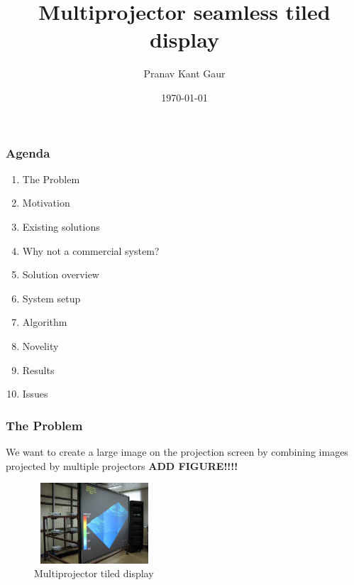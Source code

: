\documentclass{beamer}
\title{Multiprojector seamless tiled display}
\author{Pranav Kant Gaur}
\institute{Graphics and Visualization section}
\date{\today}
\begin{document}
\begin{frame}
\titlepage
\end{frame}

\begin{frame}
\frametitle{Agenda}
\begin{enumerate}
\item The Problem 
\item Motivation
\item Existing solutions
\item Why not a commercial system?
\item Solution overview
\item System setup
\item Algorithm 
\item Novelity
\item Results
\item Issues
\end{enumerate}
\end{frame}

\begin{frame}
\frametitle{The Problem}
We want to create a large image on the projection screen by combining images projected by multiple projectors \textbf{ADD FIGURE!!!!}

\begin{figure}
\includegraphics[width=4.5cm,height=3cm]{figures/system_setup.jpg}
\caption{Multiprojector tiled display}
\end{figure}

\end{frame}
\end{document}
